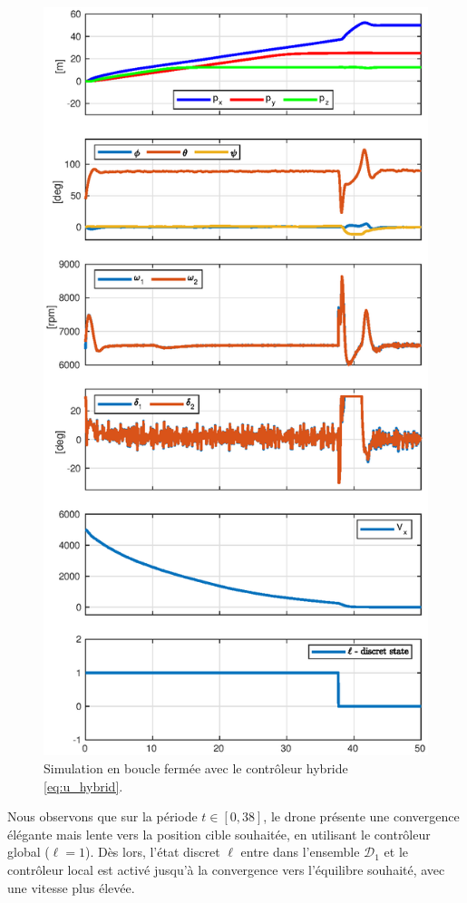 \begin{figure}[ht! ]
    \centering
    \includegraphics[trim=0cm 0cm 0cm 1.1cm,clip,width=0.8\columnwidth]{figures/switch_paper2.eps}
    \caption{Simulation en boucle fermée avec le contrôleur hybride \eqref{eq:u_hybrid}.}
    \label{fig_sim}
\end{figure}

Nous observons que sur la période $t \in \left[0,38\right]$, le drone
présente une convergence élégante mais lente vers la position cible souhaitée, en utilisant le contrôleur global ($\ell=1$). Dès lors, l'état discret $\ell$ entre dans l'ensemble $\mathcal{D}_1$ et le contrôleur local est activé jusqu'à la convergence vers l'équilibre souhaité, avec une vitesse plus élevée.

